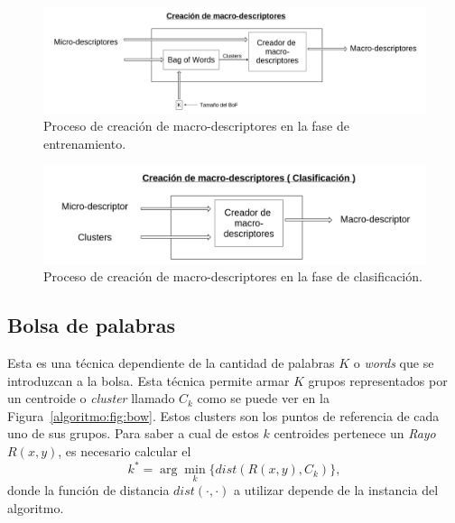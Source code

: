	\begin{figure}[bt]
		\centering
    		\includegraphics[width=1\textwidth]{Figuras/Diagramas/Extractor_macrodescriptores_entrenamiento.png}
  		\caption{Proceso de creación de macro-descriptores en la fase de entrenamiento.}
  		\label{algoritmo:fig:macro_descriptores:entrenamiento}
	\end{figure}	
	
	
	\begin{figure}[bt]
		\centering
    		\includegraphics[width=1\textwidth]{Figuras/Diagramas/Extractor_macrodescriptores_clasificacion.png}
  		\caption{Proceso de creación de macro-descriptores en la fase de clasificación.}
  		\label{algoritmo:fig:macro_descriptores:clasificacion}
	\end{figure}	

	\subsection{Bolsa de palabras}
	\label{algoritmo:bow}
		Esta es una técnica dependiente de la cantidad de palabras $K$ o \textit{words} que se introduzcan a la bolsa. Esta técnica permite armar $K$ grupos representados por un centroide o \textit{cluster} llamado $C_k$ como se puede ver en la Figura~\ref{algoritmo:fig:bow}. Estos clusters son los puntos de referencia de cada uno de sus grupos. Para saber a cual de estos $k$ centroides pertenece un \textit{Rayo} $R(x,y)$, es necesario calcular el
		\begin{equation}
  			\label{algoritmo:eq:dist}
			k^* = \arg \min_k \{\mathit{dist}(R(x,y),C_k)\},
		\end{equation}
		donde la función de distancia $\mathit{dist}(\cdot,\cdot)$ a utilizar depende de la instancia del algoritmo.

